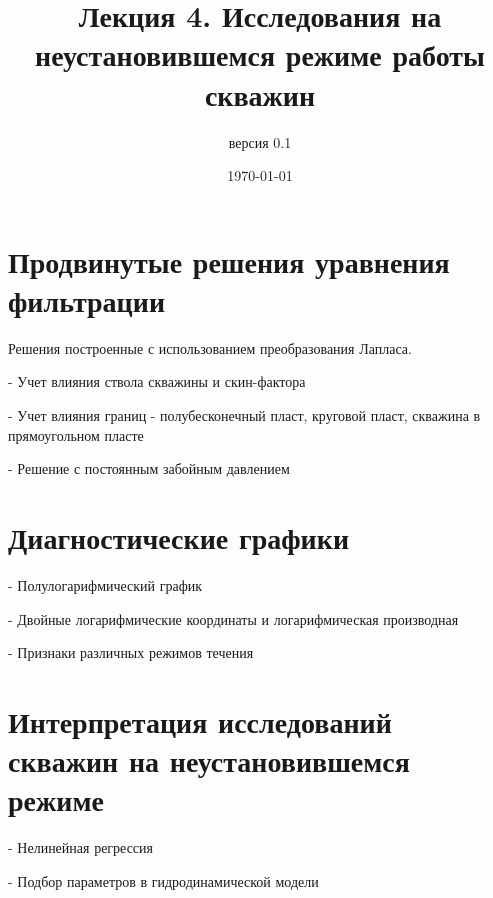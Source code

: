 \documentclass[oneside, openany]{memoir}
\author{версия 0.1}
\title{Лекция 4. Исследования на неустановившемся режиме работы скважин}
\date{\today}
\begin{document}
	
	\maketitle
	
	
	
	\chapter{Продвинутые решения уравнения фильтрации}
	
	Решения построенные с использованием преобразования Лапласа.
	
	- Учет влияния ствола скважины и скин-фактора
	
	- Учет влияния границ - полубесконечный пласт, круговой пласт, скважина в прямоугольном пласте
	
	- Решение с постоянным забойным давлением
	
	
	
	\chapter{Диагностические графики}
	
	- Полулогарифмический график
	
	- Двойные логарифмические координаты и логарифмическая производная
	
	- Признаки различных режимов течения 
	
	
	\chapter{Интерпретация исследований скважин на неустановившемся режиме}
	
	- Нелинейная регрессия
	
	- Подбор параметров в гидродинамической модели
	
	
	
	
	
	
	\printbibliography
	
	
\end{document}
